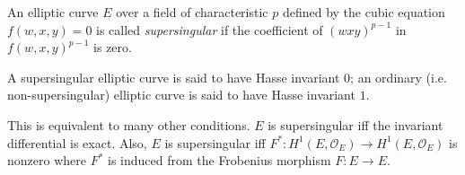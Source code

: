 \documentclass{article}
\begin{document}
An elliptic curve $E$ over a field of characteristic $p$ defined by the cubic equation $f(w,x,y) = 0$ is called {\em supersingular}  if the coefficient of $(wxy)^{p-1}$ in $f(w,x,y)^{p-1}$ is zero.

A supersingular elliptic curve is said to have Hasse invariant $0$; an ordinary (i.e. non-supersingular) elliptic curve is said to have Hasse invariant $1$.

This is equivalent to many other conditions.  $E$ is supersingular iff the invariant differential is exact.
Also, $E$ is supersingular iff $F^* : H^1(E,\mathcal{O}_E)\to H^1(E,\mathcal{O}_E)$ is nonzero where $F^*$ is induced from the Frobenius morphism $F : E\to E$.
\end{document}
